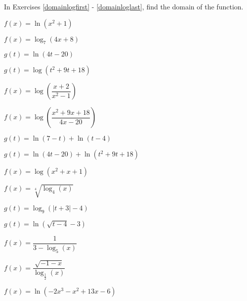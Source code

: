 \documentclass{ximera}
\begin{document}
\begin{question}
In Exercises \ref{domainlogfirst} - \ref{domainloglast}, find the domain of the function.

\begin{problem}\label{domainlogfirst}
$f(x) = \ln(x^{2} + 1)$
\end{problem}

\begin{problem}
$f(x) = \log_{7}(4x + 8)$
\end{problem}

\begin{problem}
$g(t) = \ln(4t-20)$
\end{problem}

\begin{problem}
$g(t) = \log \left(t^2+9t+18\right)$
\end{problem}

\begin{problem}
$f(x) = \log \left(\dfrac{x + 2}{x^{2} - 1}\right)$
\end{problem}

\begin{problem}
$f(x) = \log\left(\dfrac{x^2+9x+18}{4x-20}\right)$
\end{problem}

\begin{problem}
$g(t) = \ln(7 - t) + \ln(t - 4)$
\end{problem}

\begin{problem}
$g(t) = \ln(4t-20) + \ln\left(t^2+9t+18\right)$
\end{problem}

\begin{problem}
$f(x) = \log\left(x^2+x+1\right)$
\end{problem}

\begin{problem}
$f(x) = \sqrt[4]{\log_{4} (x)}$
\end{problem}

\begin{problem}
$g(t) = \log_{9}(|t + 3| - 4)$
\end{problem}

\begin{problem}
$g(t) = \ln(\sqrt{t - 4} - 3)$
\end{problem}

\begin{problem}
$f(x) = \dfrac{1}{3 - \log_{5} (x)}$
\end{problem}

\begin{problem}
$f(x) = \dfrac{\sqrt{-1 - x}}{\log_{\frac{1}{2}} (x)}$
\end{problem}

\begin{problem}\label{domainloglast}
$f(x) = \ln(-2x^{3} - x^{2} + 13x - 6)$  
\end{problem}

\end{question}
\end{document}
